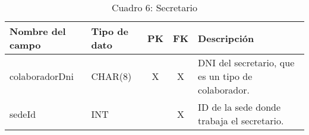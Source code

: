 \begin{table}[H]
	\centering
	\begin{tabular}{|l|l|c|c|l|}
		\hline
		\textbf{Nombre del campo} & \textbf{Tipo de dato} & \textbf{PK} & \textbf{FK} & \textbf{Descripción}                               \\
		\hline
		colaboradorDni            & CHAR(8)               & X           & X           & DNI del secretario, que es un tipo de colaborador. \\
		\hline
		sedeId                    & INT                   &             & X           & ID de la sede donde trabaja el secretario.         \\
		\hline
	\end{tabular}
	\caption{Cuadro 6: Secretario}
\end{table}